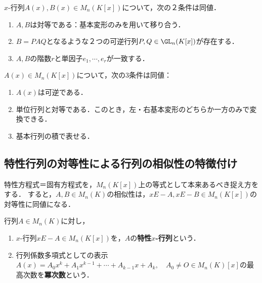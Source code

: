 \documentclass[uplatex, dvipdfmx]{jsreport}
\begin{document}
\begin{corollary}[$x$-行列の対等性の特徴付け]
    $x$-行列$A(x),B(x)\in M_n(K[x])$について，次の２条件は同値．
    \begin{enumerate}
        \item $A,B$は対等である：基本変形のみを用いて移り合う．
        \item $B=PAQ$となるような２つの可逆行列$P,Q\in\GL_n(K[x])$が存在する．
        \item $A,B$の階数$r$と単因子$e_1,\cdots,e_r$が一致する．
    \end{enumerate}
\end{corollary}

\begin{corollary}[単模行列の特徴付け]
    $A(x)\in M_n(K[x])$について，次の3条件は同値：
    \begin{enumerate}
        \item $A(x)$は可逆である．
        \item 単位行列と対等である．このとき，左・右基本変形のどちらか一方のみで変換できる．
        \item 基本行列の積で表せる．
    \end{enumerate}
\end{corollary}

\subsection{特性行列の対等性による行列の相似性の特徴付け}

\begin{tcolorbox}[colframe=ForestGreen, colback=ForestGreen!10!white,breakable,colbacktitle=ForestGreen!40!white,coltitle=black,fonttitle=\bfseries\sffamily,
title=]
    特性方程式＝固有方程式を，$M_n(K[x])$上の等式として本来あるべき捉え方をする．
    すると，$A,B\in M_n(K)$の相似性は，$xE-A,xE-B\in M_n(K[x])$の対等性に同値になる．
\end{tcolorbox}

\begin{definition}
    行列$A\in M_n(K)$に対し，
    \begin{enumerate}
        \item $x$-行列$xE-A\in M_n(K[x])$を，$A$の\textbf{特性$x$-行列}という．
        \item 行列係数多項式としての表示$A(x)=A_0x^k+A_1x^{k-1}+\cdots+A_{k-1}x+A_k,\quad A_0\ne O\in M_n(K)[x]$の最高次数を\textbf{冪次数}という．
    \end{enumerate}
\end{definition}
\end{document}
